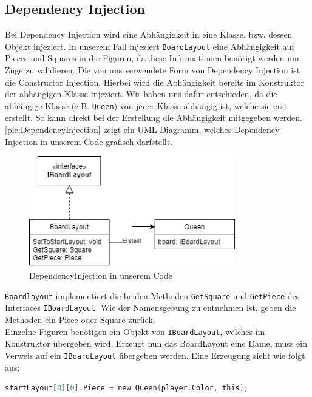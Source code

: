 \documentclass[
10pt, %
a4paper, %
oneside, %
headinclude,footinclude, %
BCOR5mm, %
]{scrartcl}
\begin{document}
\begin{onehalfspace}
\subsection{Dependency Injection}
\label{sec:depInjec}
Bei Dependency Injection wird eine Abhängigkeit in eine Klasse, bzw. dessen Objekt injeziert. In unserem Fall injeziert \texttt{BoardLayout} eine Abhängigkeit auf Pieces und Squares in die Figuren, da diese Informationen benötigt werden um Züge zu validieren. Die von uns verwendete Form von Dependency Injection ist die Constructor Injection. Hierbei wird die Abhängigkeit bereits im Konstruktor der abhängigen Klasse injeziert. Wir haben uns dafür entschieden, da die abhängige Klasse (z.B. \texttt{Queen}) von jener Klasse abhängig ist, welche sie erst erstellt. So kann direkt bei der Erstellung die Abhängigkeit mitgegeben werden. \autoref{pic:DependencyInjection} zeigt ein UML-Diagramm, welches Dependency Injection in unserem Code grafisch darfstellt.

\begin{figure}[h]
	\begin{center}
		\includegraphics[width=9cm]{DependencyInjection.png}
		\caption{\label{pic:DependencyInjection}DependencyInjection in unserem Code}
	\end{center}
\end{figure}

\texttt{Boardlayout} implementiert die beiden Methoden \texttt{GetSquare} und \texttt{GetPiece} des Interfaces \texttt{IBoardLayout}. Wie der Namensgebung zu entnehmen ist, geben die Methoden ein Piece oder Square zurück. \\
Einzelne Figuren benötigen ein Objekt von \texttt{IBoardLayout}, welches im Konstruktor übergeben wird. Erzeugt nun das BoardLayout eine Dame, muss ein Verweis auf ein \texttt{IBoardLayout} übergeben werden. Eine Erzeugung sieht wie folgt aus:

\begin{lstlisting}[language=c, style=mStyle]
startLayout[0][0].Piece = new Queen(player.Color, this);
\end{lstlisting}


\end{onehalfspace}
\end{document}
